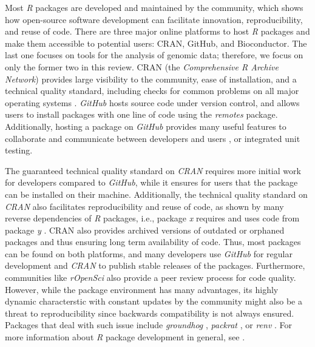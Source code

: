 \documentclass[smallextended]{svjour3}       %
\begin{document}
Most \emph{R} packages are developed and maintained by the community, which shows how open-source software development can facilitate innovation, reproducibility, and reuse of code.
There are three major online platforms to host \emph{R} packages and make them accessible to potential users: CRAN, GitHub, and Bioconductor.
The last one focuses on tools for the analysis of genomic data; therefore, we focus on only the former two in this review.
CRAN (the \emph{Comprehensive R Archive Network}) provides large visibility to the community, ease of installation, and a technical quality standard, including checks for common problems on all major operating systems \cite{Wickham2015}.
\emph{GitHub} hosts source code under version control, and allows users to install packages with one line of code using the \emph{remotes} \cite{Hester2020} package.
Additionally, hosting a package on \emph{GitHub} provides many useful features to collaborate and communicate between developers and users \cite{Wickham2015}, or integrated unit testing.

The guaranteed technical quality standard on \emph{CRAN} requires more initial work for developers compared to \emph{GitHub}, while it ensures for users that the package can be installed on their machine.
Additionally, the technical quality standard on \emph{CRAN} also facilitates reproducibility and reuse of code, as shown by many reverse dependencies of \emph{R} packages, i.e., package \emph{x} requires and uses code from package \emph{y} \cite{vonKrogh2006,St.Laurent2008,Steiniger2009,Prlic2012,Powers2019}.
CRAN also provides archived versions of outdated or orphaned packages and thus ensuring long term availability of code.
Thus, most packages can be found on both platforms, and many developers use \emph{GitHub} for regular development and \emph{CRAN} to publish stable releases of the packages.
Furthermore, communities like \emph{rOpenSci} also provide a peer review process for code quality.
However, while the package environment has many advantages, its highly dynamic characterstic with constant updates by the community might also be a threat to reproducibility since backwards compatibility is not always ensured.
Packages that deal with such issue include \emph{groundhog} \cite{Simonsohn2021}, \emph{packrat} \cite{Ushey2018}, or \emph{renv} \cite{Ushey2020}.
For more information about \emph{R} package development in general, see \cite{Wickham2015}.
\end{document}

